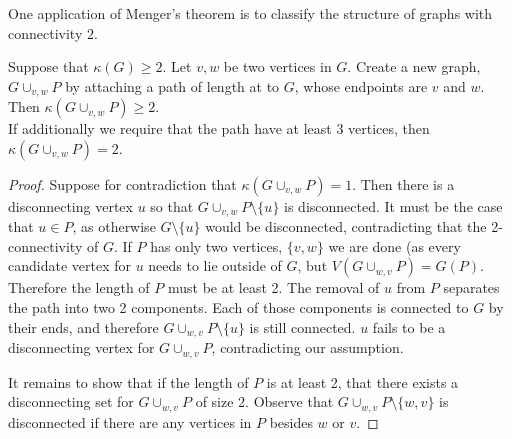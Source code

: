 One application of Menger's theorem is to classify the structure of graphs with connectivity $2$.
\begin{lemma}
	Suppose that $\kappa(G)\geq 2$.
	 Let $v,w$ be two vertices in $G$. 
	Create a new graph, $G\cup_{v,w} P$ by attaching a path of length at to $G$, whose endpoints are $v$ and $w$. 
	Then $\kappa(G\cup_{v, w}P)\geq 2$.\\
	If additionally we require that the path have at least 3 vertices, then $\kappa(G\cup_{v, w}P)=2$. 
\end{lemma}
\begin{proof}
	Suppose for contradiction that $\kappa(G\cup_{v, w}P)=1$. Then there is a disconnecting vertex $u$ so that $G\cup_{v, w}P\setminus \{u\}$ is disconnected.
	It must be the case that $u\in P$, as otherwise $G\setminus \{u\}$ would be disconnected, contradicting that the 2-connectivity of $G$. 
	If $P$ has only two vertices, $\{v, w\}$ we are done (as every candidate vertex for $u$ needs to lie outside of $G$, but $V(G\cup_{w,v}P)=G(P)$. Therefore the length of $P$ must be at least 2. The removal of $u$ from  $P$ separates the path into two 2 components. 
	Each of those components is connected to $G$ by their ends, and therefore $G\cup_{w,v}P\setminus\{u\}$ is still connected.
	$u$ fails to be a disconnecting vertex for $G\cup_{w,v}P$, contradicting our assumption. 

	It remains to show that if the length of $P$ is at least 2, that there exists a disconnecting set for $G\cup_{w,v}P$ of size 2. Observe that $G\cup_{w,v}P\setminus\{w, v\}$ is disconnected if there are any vertices in $P$ besides $w$ or $v$. 
\end{proof}


